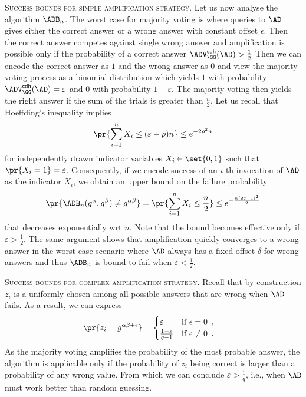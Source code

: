 \documentclass{crypto-exercise}
\begin{document}
\begin{solution}
\vspace*{2ex}
\noindent\textsc{Success bounds for simple amplification strategy.}
Let us now analyse the algorithm $\ADB_n$.
The worst case for majority voting is where queries to $\AD$ gives either the correct answer or a wrong answer with constant offset $\epsilon$. 
Then the correct answer competes against single wrong answer and amplification is possible only if the probability of a correct answer $\ADVCDH{\GG}{\AD}>\frac{1}{2}$
Then we can encode the correct answer as  $1$ and the wrong answer as $0$ and view the majority voting process as a binomial distribution which yields $1$ with probability $\ADVCDH{\GG}{\AD} = \varepsilon$ and 0 with probability $1-\varepsilon$. The majority voting then yields the right answer if the sum of the trials is greater than $\frac{n}{2}$.
Let us recall that Hoeffding's inequality implies 
\begin{align*}
\pr{\sum_{i=1}^n X_i \leq (\varepsilon - \rho)n} \leq e^{-2\rho^2n}
\end{align*}
for independently drawn indicator variables $X_i\in\set{0,1}$ such that $\pr{X_i=1}=\varepsilon$.
Consequently, if we encode success of an $i$-th invocation of $\AD$ as the indicator $X_i$, we obtain an upper bound on the failure probability  
\begin{align*}
\pr{\ADB_n(g^\alpha,g^\beta)\neq g^{\alpha \beta}}= \pr{\sum_{i=1}^n X_i \leq \frac{n}{2}}\leq e^{-\frac{n(2\varepsilon-1)^2}{2}}
\end{align*}
that decreases exponentially wrt $n$. Note that the bound becomes effective only if $\varepsilon > \frac{1}{2}$. The same argument shows that amplification quickly converges to a wrong answer in the worst case scenario where $\AD$ always has a fixed offset $\delta$ for wrong answers and thus $\ADB_n$ is bound to fail when $\varepsilon < \frac{1}{2}$.
 
\vspace*{2ex}
\noindent\textsc{Success bounds for complex amplification strategy.}
Recall that by construction $z_i$ is a uniformly chosen among all possible answers that are wrong when $\AD$ fails. As a result, we can express 
\begin{align*}
\pr{z_i=g^{\alpha\beta+\epsilon}}&=
\begin{cases}
\varepsilon &\text{if } \epsilon=0\enspace,\\ 
\frac{1-\varepsilon}{q-1}    &\text{if } \epsilon\neq 0\enspace.\\ 
\end{cases}
\end{align*}
As the majority voting amplifies the probability of the most probable answer, the algorithm is applicable only if the probability of $z_i$ being correct is larger than a probability of any wrong value. From which we can conclude $\varepsilon >\frac{1}{q}$, i.e., when $\AD$ must work better than random guessing.   


\end{solution}
\end{document}
